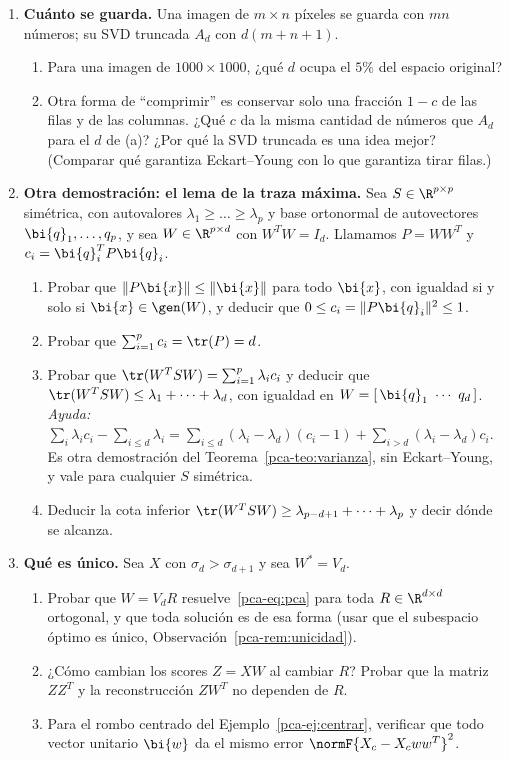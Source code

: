 \begin{enumerate}[leftmargin=*,label=\textbf{\thechapter.\arabic*},ref=\thechapter.\arabic*,itemsep=4pt]
\item {} \textbf{Cuánto se guarda.} Una imagen de $m\times n$
píxeles se guarda con $mn$ números; su SVD truncada $A_d$ con $d(m+n+1)$.
\begin{enumerate}[label=(\alph*)]
\item Para una imagen de $1000\times1000$, ¿qué $d$ ocupa el $5\%$ del
espacio original?
\item Otra forma de ``comprimir'' es conservar solo una fracción $1-c$ de las
filas y de las columnas. ¿Qué $c$ da la misma cantidad de números que $A_d$
para el $d$ de (a)? ¿Por qué la SVD truncada es una idea mejor? (Comparar qué
garantiza Eckart--Young con lo que garantiza tirar filas.)
\end{enumerate}

\item {} \textbf{Otra demostración: el lema de la traza máxima.}\label{pca-ej:traza-maxima}
Sea $S\in\R^{p\times p}$ simétrica, con autovalores
$\lambda_1\ge\dots\ge\lambda_p$ y base ortonormal de autovectores
$\bi{q}_1,\dots,q_p$, y sea $W\in\R^{p\times d}$ con $W^T W=I_d$. Llamamos
$P=WW^T$ y $c_i=\bi{q}_i^T P\bi{q}_i$.
\begin{enumerate}[label=(\alph*)]
\item Probar que $\|P\bi{x}\|\le\|\bi{x}\|$ para todo $\bi{x}$, con igualdad si y solo si
$\bi{x}\in\gen(W)$, y deducir que $0\le c_i=\|P\bi{q}_i\|^2\le1$.
\item Probar que $\sum_{i=1}^pc_i=\tr(P)=d$.
\item Probar que $\tr(W^T SW)=\sum_{i=1}^p\lambda_ic_i$ y deducir que
$\tr(W^T SW)\le\lambda_1+\dots+\lambda_d$, con igualdad en
$W=[\,\bi{q}_1\ \cdots\ q_d\,]$. \emph{Ayuda:}
$\sum_i\lambda_ic_i-\sum_{i\le d}\lambda_i=\sum_{i\le d}(\lambda_i-\lambda_d)(c_i-1)+\sum_{i>d}(\lambda_i-\lambda_d)c_i$.
Es otra demostración del Teorema~\ref{pca-teo:varianza}, sin Eckart--Young,
y vale para cualquier $S$ simétrica.
\item Deducir la cota inferior
$\tr(W^T SW)\ge\lambda_{p-d+1}+\dots+\lambda_p$ y decir dónde se alcanza.
\end{enumerate}

\item {} \textbf{Qué es único.} Sea $X$ con
$\sigma_d>\sigma_{d+1}$ y sea $W^\ast=V_d$.
\begin{enumerate}[label=(\alph*)]
\item Probar que $W=V_dR$ resuelve~\eqref{pca-eq:pca} para toda $R\in\R^{d\times d}$
ortogonal, y que toda solución es de esa forma (usar que el subespacio
óptimo es único, Observación~\ref{pca-rem:unicidad}).
\item ¿Cómo cambian los scores $Z=XW$ al cambiar $R$? Probar que la matriz
$ZZ^T$ y la reconstrucción $ZW^T$ no dependen de $R$.
\item Para el rombo centrado del Ejemplo~\ref{pca-ej:centrar}, verificar que
todo vector unitario $\bi{w}$ da el mismo error $\normF{X_c-X_cww^T}^2$.
\end{enumerate}


\end{enumerate}
